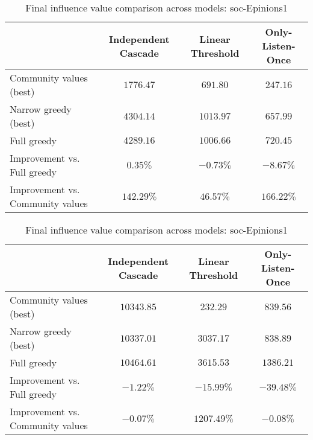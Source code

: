 \documentclass[pdflatex,sn-mathphys-num]{sn-jnl}
\begin{document}
\begin{table}[ht]

\caption{Final influence value comparison across models: cit-HepPh}
\label{table_performance_comparison_cithep}
\begin{tabular}{@{}lccc@{}}
\toprule
& Independent Cascade & Linear Threshold & Only-Listen-Once \\
\midrule
Community values (best)\footnotemark[5] & $1776.47$ & $691.80$ & $247.16$ \\
Narrow greedy (best)\footnotemark[5] & $4304.14$ & $1013.97$ & $657.99$ \\
Full greedy & $4289.16$ & $1006.66$ & $720.45$ \\
\midrule
Improvement vs. Full greedy & $0.35\%$ & $-0.73\%$ & $-8.67\%$ \\
Improvement vs. Community values & $142.29\%$ & $46.57\%$ & $166.22\%$ \\
\midrule
\end{tabular}

\vspace{7.5mm}

\caption{Final influence value comparison across models: soc-Epinions1}
\label{table_performance_comparison_socepinions}
\begin{tabular}{@{}lccc@{}}
\toprule
& Independent Cascade & Linear Threshold & Only-Listen-Once \\
\midrule
Community values (best)\footnotemark[5] & $10343.85$ & $232.29$ & $839.56$ \\
Narrow greedy (best)\footnotemark[5] & $10337.01$ & $3037.17$ & $838.89$ \\
Full greedy & $10464.61$ & $3615.53$ & $1386.21$ \\
\midrule
Improvement vs. Full greedy & $-1.22\%$ & $-15.99\%$ & $-39.48\%$ \\
Improvement vs. Community values & $-0.07\%$ & $1207.49\%$ & $-0.08\%$ \\
\midrule
\end{tabular}

\vspace{7.5mm}


\end{table}
\end{document}
